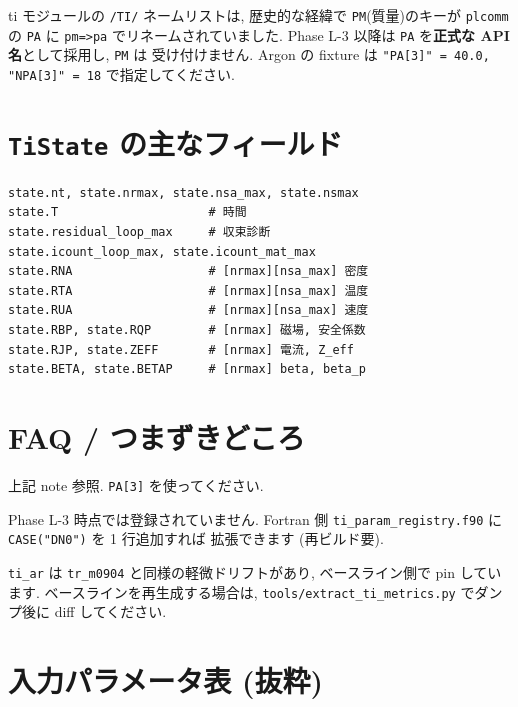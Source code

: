 \documentclass[11pt,a4paper]{report}
\begin{document}
\begin{note}
ti モジュールの \texttt{/TI/} ネームリストは, 歴史的な経緯で
\texttt{PM}(質量)のキーが \texttt{plcomm} の \texttt{PA} に
\texttt{pm=>pa} でリネームされていました. Phase L-3 以降は
\texttt{PA} を\textbf{正式な API 名}として採用し, \texttt{PM} は
受け付けません. Argon の fixture は \texttt{"PA[3]" = 40.0,
"NPA[3]" = 18} で指定してください.
\end{note}

\section{\texttt{TiState} の主なフィールド}

\begin{lstlisting}[style=py]
state.nt, state.nrmax, state.nsa_max, state.nsmax
state.T                     # 時間
state.residual_loop_max     # 収束診断
state.icount_loop_max, state.icount_mat_max
state.RNA                   # [nrmax][nsa_max] 密度
state.RTA                   # [nrmax][nsa_max] 温度
state.RUA                   # [nrmax][nsa_max] 速度
state.RBP, state.RQP        # [nrmax] 磁場, 安全係数
state.RJP, state.ZEFF       # [nrmax] 電流, Z_eff
state.BETA, state.BETAP     # [nrmax] beta, beta_p
\end{lstlisting}

\section{FAQ / つまずきどころ}

\begin{faq}
上記 note 参照. \texttt{PA[3]} を使ってください.
\end{faq}

\begin{faq}
Phase L-3 時点では登録されていません. Fortran 側
\texttt{ti\_param\_registry.f90} に \texttt{CASE("DN0")} を 1 行追加すれば
拡張できます (再ビルド要).
\end{faq}

\begin{faq}
\texttt{ti\_ar} は \texttt{tr\_m0904} と同様の軽微ドリフトがあり,
ベースライン側で pin しています. ベースラインを再生成する場合は,
\texttt{tools/extract\_ti\_metrics.py} でダンプ後に diff してください.
\end{faq}

\section{入力パラメータ表 (抜粋)}
\end{document}
